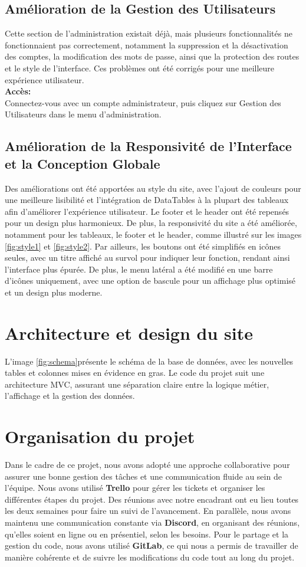 \documentclass[12pt]{article}
\begin{document}
\subsection{Amélioration de la Gestion des Utilisateurs}
Cette section de l’administration existait déjà, mais plusieurs fonctionnalités ne fonctionnaient pas correctement, notamment la suppression et la désactivation des comptes, la modification des mots de passe, ainsi que la protection des routes et le style de l’interface. Ces problèmes ont été corrigés pour une meilleure expérience utilisateur. \\
\textbf{Accès: } \\
Connectez-vous avec un compte administrateur, puis cliquez sur Gestion des Utilisateurs dans le menu d’administration.
\subsection{Amélioration de la Responsivité de l'Interface et la Conception Globale}
Des améliorations ont été apportées au style du site, avec l'ajout de couleurs pour une meilleure lisibilité et l'intégration de DataTables à la plupart des tableaux afin d'améliorer l'expérience utilisateur. Le footer et le header ont été repensés pour un design plus harmonieux. De plus, la responsivité du site a été améliorée, notamment pour les tableaux, le footer et le header, comme illustré sur les images \ref{fig:style1} et \ref{fig:style2}. Par ailleurs, les boutons ont été simplifiés en icônes seules, avec un titre affiché au survol pour indiquer leur fonction, rendant ainsi l’interface plus épurée. De plus, le menu latéral a été modifié en une barre d’icônes uniquement, avec une option de bascule pour un affichage plus optimisé et un design plus moderne.
\section{Architecture et design du site}
L’image \ref{fig:schema}présente le schéma de la base de données, avec les nouvelles tables et colonnes mises en évidence en gras. Le code du projet suit une architecture MVC, assurant une séparation claire entre la logique métier, l’affichage et la gestion des données.
\section{Organisation du projet}
Dans le cadre de ce projet, nous avons adopté une approche collaborative pour assurer une bonne gestion des tâches et une communication fluide au sein de l'équipe. Nous avons utilisé \textbf{Trello} pour gérer les tickets et organiser les différentes étapes du projet. Des réunions avec notre encadrant ont eu lieu toutes les deux semaines pour faire un suivi de l'avancement. En parallèle, nous avons maintenu une communication constante via \textbf{Discord}, en organisant des réunions, qu'elles soient en ligne ou en présentiel, selon les besoins. Pour le partage et la gestion du code, nous avons utilisé \textbf{GitLab}, ce qui nous a permis de travailler de manière cohérente et de suivre les modifications du code tout au long du projet.
\end{document}
